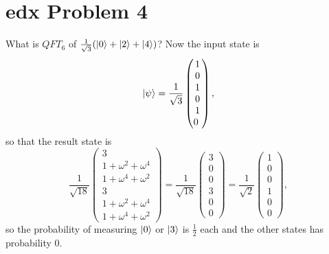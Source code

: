 \documentclass[10pt]{article}
\begin{document}
\section*{edx Problem 4}
What is $QFT_6$ of $\frac{1}{\sqrt{3}} ( \ket{0} + \ket{2} + \ket{4} )$? Now the input state is
\[
\ket{\psi} = 
\frac{1}{\sqrt{3}}
\begin{pmatrix}
1 \\ 0 \\ 1 \\ 0 \\ 1 \\ 0 \
\end{pmatrix},
\]
so that the result state is
\[
\frac{1}{\sqrt{18}}
\begin{pmatrix}
3 \\
1 + \omega^2 + \omega^4 \\
1 + \omega^4 + \omega^2 \\
3 \\
1 + \omega^2 + \omega^4 \\
1 + \omega^4 + \omega^2 
\end{pmatrix}
= 
\frac{1}{\sqrt{18}}
\begin{pmatrix}
3 \\
0 \\
0 \\
3 \\
0 \\
0
\end{pmatrix}
= 
\frac{1}{\sqrt{2}}
\begin{pmatrix}
1 \\
0 \\
0 \\
1 \\
0 \\
0
\end{pmatrix},
\]
 so the probability of measuring $\ket{0}$ or $\ket{3}$ is $\frac{1}{2}$ each and the other states has probability 0.
\end{document}
